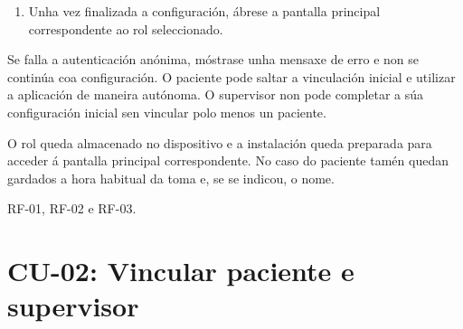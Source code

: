 \begin{description}
\begin{enumerate}
    \item Unha vez finalizada a configuración, ábrese a pantalla principal
    correspondente ao rol seleccionado.
\end{enumerate}

\item[Fluxos alternativos:] Se falla a autenticación anónima, móstrase unha
mensaxe de erro e non se continúa coa configuración. O paciente pode saltar a
vinculación inicial e utilizar a aplicación de maneira autónoma. O supervisor
non pode completar a súa configuración inicial sen vincular polo menos un
paciente.

\item[Postcondicións:] O rol queda almacenado no dispositivo e a instalación
queda preparada para acceder á pantalla principal correspondente. No caso do
paciente tamén quedan gardados a hora habitual da toma e, se se indicou, o nome.

\item[Requisitos relacionados:] RF-01, RF-02 e RF-03.

\end{description}



\section{CU-02: Vincular paciente e supervisor}
\label{cu:vincular-paciente-supervisor}


